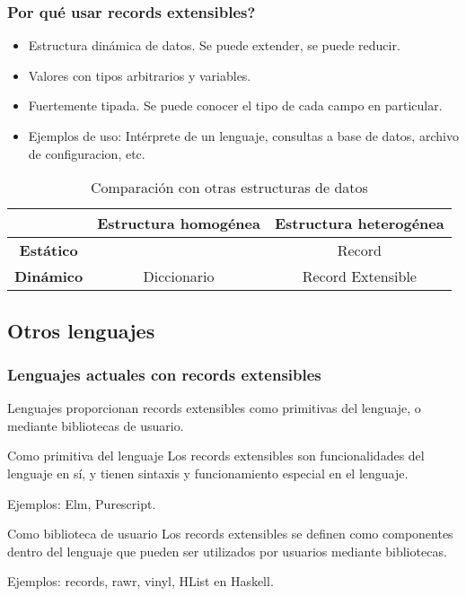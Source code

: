 \documentclass{beamer}
\begin{document}
\begin{frame}
\frametitle{Por qué usar records extensibles?}

\begin{itemize}
\item Estructura dinámica de datos. Se puede extender, se puede reducir.
\item Valores con tipos arbitrarios y variables.
\item Fuertemente tipada. Se puede conocer el tipo de cada campo en particular.
\item Ejemplos de uso: Intérprete de un lenguaje, consultas a base de datos, archivo de configuracion, etc.
\end{itemize}

\begin{table}
\begin{tabular}{c | c c}
 & \textbf{Estructura homogénea} & \textbf{Estructura heterogénea} \\
\hline
\textbf{Estático} & & Record \\
\textbf{Dinámico} & Diccionario & Record Extensible
\end{tabular}
\caption{Comparación con otras estructuras de datos}
\end{table}

\end{frame}

\subsection{Otros lenguajes}

\begin{frame}
\frametitle{Lenguajes actuales con records extensibles}

Lenguajes proporcionan records extensibles como primitivas del lenguaje, o mediante bibliotecas de usuario.

\pause

\begin{block}{Como primitiva del lenguaje}
Los records extensibles son funcionalidades del lenguaje en sí, y tienen sintaxis y funcionamiento especial en el lenguaje.

Ejemplos: Elm, Purescript.
\end{block}

\pause

\begin{block}{Como biblioteca de usuario}
Los records extensibles se definen como componentes dentro del lenguaje que pueden ser utilizados por usuarios mediante bibliotecas.

Ejemplos: records, rawr, vinyl, HList en Haskell.
\end{block}


\end{frame}
\end{document}
